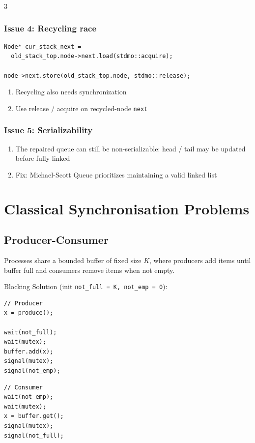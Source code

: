 \documentclass[12pt, a4paper]{article}
\begin{document}
\begin{multicols*}{3}
\subsubsection{Issue 4: Recycling race}
\begin{lstlisting}[basicstyle=\ttfamily\scriptsize]
Node* cur_stack_next =
  old_stack_top.node->next.load(stdmo::acquire);

node->next.store(old_stack_top.node, stdmo::release);
\end{lstlisting}
\begin{enumerate}[$\bullet$]
  \item Recycling also needs synchronization
  \item Use release / acquire on recycled-node \lstinline|next|
\end{enumerate}

\subsubsection{Issue 5: Serializability}
\begin{enumerate}[$\bullet$]
  \item The repaired queue can still be non-serializable: head / tail may be updated before fully linked
  \item Fix: Michael-Scott Queue prioritizes maintaining a valid linked list 
\end{enumerate}

\colbreak
\section{Classical Synchronisation Problems}
\lstset{style=c}
\subsection{Producer-Consumer}
Processes share a bounded buffer of fixed size $K$, where producers add items until buffer full and consumers remove items when not empty.

Blocking Solution (init \lstinline|not_full = K, not_emp = 0|):\\
\begin{minipage}{0.45\columnwidth}
  \begin{lstlisting}
// Producer
x = produce();

wait(not_full);
wait(mutex);
buffer.add(x);
signal(mutex);
signal(not_emp);
  \end{lstlisting}
\end{minipage}
\begin{minipage}{0.5\columnwidth}
  \begin{lstlisting}
// Consumer
wait(not_emp);
wait(mutex);
x = buffer.get();
signal(mutex);
signal(not_full);


\end{lstlisting}
\end{minipage}
\end{multicols*}
\end{document}
